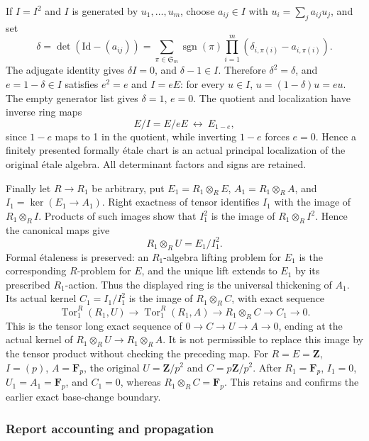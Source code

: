 If \(I=I^2\) and \(I\) is generated by \(u_1,\ldots,u_m\), choose \(a_{ij}\in I\) with \(u_i=\sum_j a_{ij}u_j\), and set \[
\delta=\det(\mathrm{Id}-(a_{ij}))
 =\sum_{\pi\in\mathfrak S_m}\operatorname{sgn}(\pi)
       \prod_{i=1}^m(\delta_{i,\pi(i)}-a_{i,\pi(i)}).
\] The adjugate identity gives \(\delta I=0\), and \(\delta-1\in I\). Therefore \(\delta^2=\delta\), and \(e=1-\delta\in I\) satisfies \(e^2=e\) and \(I=eE\): for every \(u\in I\), \(u=(1-\delta)u=eu\). The empty generator list gives \(\delta=1\), \(e=0\). The quotient and localization have inverse ring maps \[
E/I=E/eE\ \longleftrightarrow\ E_{1-e},
\] since \(1-e\) maps to 1 in the quotient, while inverting \(1-e\) forces \(e=0\). Hence a finitely presented formally étale chart is an actual principal localization of the original étale algebra. All determinant factors and signs are retained.

Finally let \(R\to R_1\) be arbitrary, put \(E_1=R_1\otimes_RE\), \(A_1=R_1\otimes_RA\), and \(I_1=\ker(E_1\to A_1)\). Right exactness of tensor identifies \(I_1\) with the image of \(R_1\otimes_R I\). Products of such images show that \(I_1^2\) is the image of \(R_1\otimes_R I^2\). Hence the canonical maps give \[
R_1\otimes_R U=E_1/I_1^2.
\] Formal étaleness is preserved: an \(R_1\)-algebra lifting problem for \(E_1\) is the corresponding \(R\)-problem for \(E\), and the unique lift extends to \(E_1\) by its prescribed \(R_1\)-action. Thus the displayed ring is the universal thickening of \(A_1\). Its actual kernel \(C_1=I_1/I_1^2\) is the image of \(R_1\otimes_R C\), with exact sequence \[
\operatorname{Tor}_1^R(R_1,U)\longrightarrow
\operatorname{Tor}_1^R(R_1,A)\longrightarrow
R_1\otimes_R C\longrightarrow C_1\longrightarrow0.
\] This is the tensor long exact sequence of \(0\to C\to U\to A\to0\), ending at the actual kernel of \(R_1\otimes_R U\to R_1\otimes_R A\). It is not permissible to replace this image by the tensor product without checking the preceding map. For \(R=E=\mathbf Z\), \(I=(p)\), \(A=\mathbf F_p\), the original \(U=\mathbf Z/p^2\) and \(C=p\mathbf Z/p^2\). After \(R_1=\mathbf F_p\), \(I_1=0\), \(U_1=A_1=\mathbf F_p\), and \(C_1=0\), whereas \(R_1\otimes_R C=\mathbf F_p\). This retains and confirms the earlier exact base-change boundary.

\subsubsection{Report accounting and propagation}\label{algebra-proof-057-report-accounting-and-propagation}

